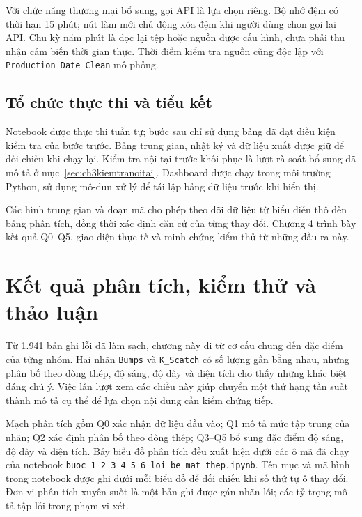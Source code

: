 \documentclass[12pt,a4paper,oneside]{report}
\newcommand{\maCot}[1]{{\urlstyle{tt}\def\UrlBreaks{\do\_\do\/\do\.}\def\UrlBigBreaks{}\nolinkurl{#1}}}
\begin{document}
Với chức năng thương mại bổ sung, gọi API là lựa chọn riêng. Bộ nhớ đệm có thời hạn 15 phút; nút làm mới chủ động xóa đệm khi người dùng chọn gọi lại API. Chu kỳ năm phút là đọc lại tệp hoặc nguồn được cấu hình, chưa phải thu nhận cảm biến thời gian thực. Thời điểm kiểm tra nguồn cũng độc lập với \maCot{Production_Date_Clean} mô phỏng.

\section{Tổ chức thực thi và tiểu kết}

Notebook được thực thi tuần tự; bước sau chỉ sử dụng bảng đã đạt điều kiện kiểm tra của bước trước. Bảng trung gian, nhật ký và dữ liệu xuất được giữ để đối chiếu khi chạy lại. Kiểm tra nội tại trước khôi phục là lượt rà soát bổ sung đã mô tả ở mục~\ref{sec:ch3kiemtranoitai}. Dashboard được chạy trong môi trường Python, sử dụng mô-đun xử lý để tái lập bảng dữ liệu trước khi hiển thị.

Các hình trung gian và đoạn mã cho phép theo dõi dữ liệu từ biểu diễn thô đến bảng phân tích, đồng thời xác định căn cứ của từng thay đổi. Chương 4 trình bày kết quả Q0--Q5, giao diện thực tế và minh chứng kiểm thử từ những đầu ra này.

\chapter{Kết quả phân tích, kiểm thử và thảo luận}
\label{chap:ketqua}

Từ 1.941 bản ghi lỗi đã làm sạch, chương này đi từ cơ cấu chung đến đặc điểm của từng nhóm. Hai nhãn \maCot{Bumps} và \maCot{K_Scatch} có số lượng gần bằng nhau, nhưng phân bố theo dòng thép, độ sáng, độ dày và diện tích cho thấy những khác biệt đáng chú ý. Việc lần lượt xem các chiều này giúp chuyển một thứ hạng tần suất thành mô tả cụ thể để lựa chọn nội dung cần kiểm chứng tiếp.

Mạch phân tích gồm Q0 xác nhận dữ liệu đầu vào; Q1 mô tả mức tập trung của nhãn; Q2 xác định phân bố theo dòng thép; Q3--Q5 bổ sung đặc điểm độ sáng, độ dày và diện tích. Bảy biểu đồ phân tích đều xuất hiện dưới các ô mã đã chạy của notebook \maCot{buoc_1_2_3_4_5_6_loi_be_mat_thep.ipynb}. Tên mục và mã hình trong notebook được ghi dưới mỗi biểu đồ để đối chiếu khi số thứ tự ô thay đổi. Đơn vị phân tích xuyên suốt là một bản ghi được gán nhãn lỗi; các tỷ trọng mô tả tập lỗi trong phạm vi xét.
\end{document}
